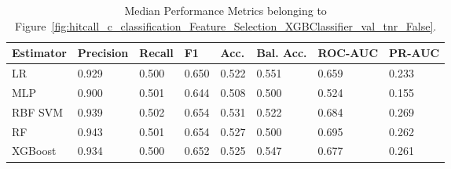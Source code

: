 \begin{longtable}{llllllll}
\caption{Median Performance Metrics belonging to Figure~\ref{fig:hitcall_c_classification_Feature_Selection_XGBClassifier_val_tnr_False}.}\label{tab:table:hitcall_c_classification_feature_selection_xgbclassifier_val_tnr_false}\\
\toprule
\midrule
\small Estimator & \small Precision & \small Recall & \small F1 & \small Acc. & \small Bal. Acc. & \small ROC-AUC & \small PR-AUC\\
\hline
LR & 0.929 & 0.500 & 0.650 & 0.522 & 0.551 & 0.659 & 0.233\\
MLP & 0.900 & 0.501 & 0.644 & 0.508 & 0.500 & 0.524 & 0.155\\
RBF SVM & 0.939 & 0.502 & 0.654 & 0.531 & 0.522 & 0.684 & 0.269\\
RF & 0.943 & 0.501 & 0.654 & 0.527 & 0.500 & 0.695 & 0.262\\
XGBoost & 0.934 & 0.500 & 0.652 & 0.525 & 0.547 & 0.677 & 0.261\\
\bottomrule
\end{longtable}